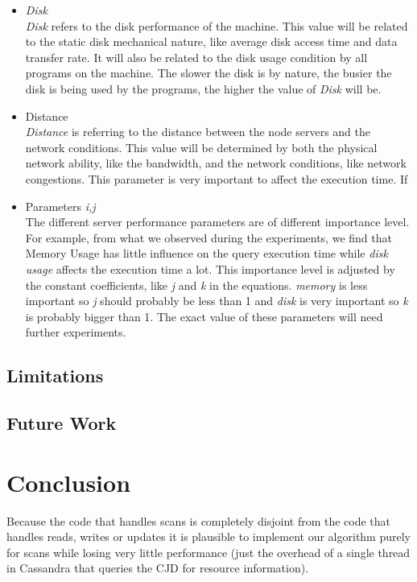 \begin{itemize}
\item{\textit{Disk}}\\
\textit{Disk} refers to the disk performance of the machine. This value will be related to the static disk mechanical nature, like average disk access time and data transfer rate. It will also be related to the disk usage condition by all programs on the machine. The slower the disk is by nature, the busier the disk is being used by the programs, the higher the value of \textit{Disk} will be. 
\item{Distance}\\
\textit{Distance} is referring to the distance between the node servers and the network conditions. This value will be determined by both the physical network ability, like the bandwidth, and the network conditions, like network congestions. This parameter is very important to affect the execution time. If  
\item{Parameters \textit{i,j}}\\
The different server performance parameters are of different importance level. For example, from what we observed during the experiments, we find that Memory Usage has little influence on the query execution time while \textit{disk usage} affects the execution time a lot. This importance level is adjusted by the constant coefficients, like \textit{j} and \textit{k} in the equations. \textit{memory} is less important so \textit{j} should probably be less than 1 and \textit{disk} is very important so \textit{k} is probably bigger than 1. The exact value of these parameters will need further experiments. 

\end{itemize}

\subsection{Limitations}

\subsection{Future Work}

\section{Conclusion}
Because the code that handles scans is completely disjoint from the code that handles reads, writes or updates it is plausible to implement our algorithm purely for scans while losing very little performance (just the overhead of a single thread in Cassandra that queries the CJD for resource information).
